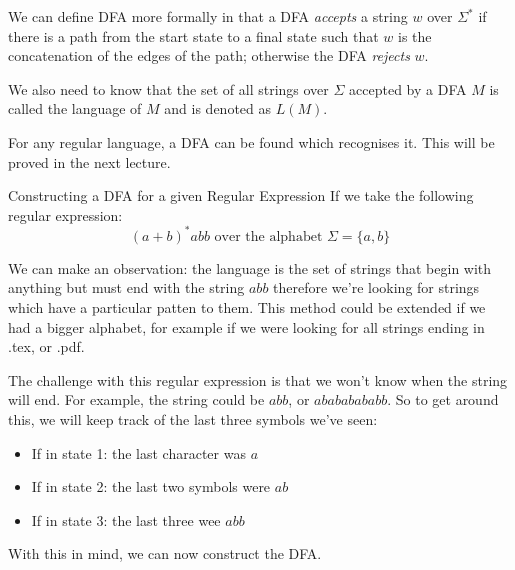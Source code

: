 We can define DFA more formally in that a DFA \textit{accepts} a string $w$ over $\Sigma^*$ if there is a path from the start state to a final state such that $w$ is the concatenation of the edges of the path; otherwise the DFA \textit{rejects} $w$.

We also need to know that the set of all strings over $\Sigma$ accepted by a DFA $M$ is called the language of $M$ and is denoted as $L(M)$.

For any regular language, a DFA can be found which recognises it. This will be proved in the next lecture.

\begin{example}{Constructing a DFA for a given Regular Expression}
If we take the following regular expression:
\[(a + b)^* abb \textrm{\ over\ the\ alphabet\ } \Sigma = \{a, b\}\]

We can make an observation: the language is the set of strings that begin with anything but must end with the string $abb$ therefore we're looking for strings which have a particular patten to them. This method could be extended if we had a bigger alphabet, for example if we were looking for all strings ending in .tex, or .pdf. 

The challenge with this regular expression is that we won't know when the string will end. For example, the string could be $abb$, or $abababababb$. So to get around this, we will keep track of the last three symbols we've seen:
\begin{itemize}
    \item If in state 1: the last character was $a$
    \item If in state 2: the last two symbols were $ab$
    \item If in state 3: the last three wee $abb$
\end{itemize}

With this in mind, we can now construct the DFA.

\begin{figure}[H]
    \centering
\end{figure}
\end{example}
